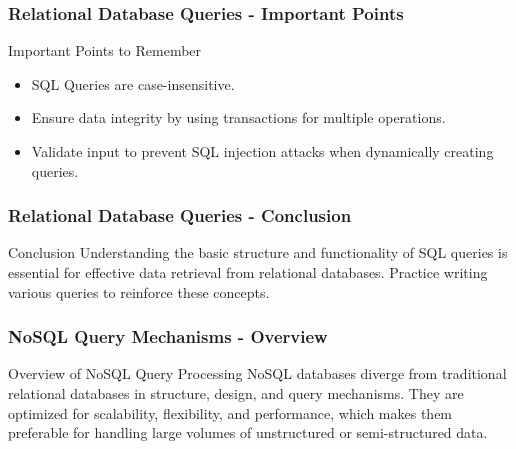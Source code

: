 \documentclass[aspectratio=169]{beamer}
\begin{document}
\begin{frame}[fragile]
    \frametitle{Relational Database Queries - Important Points}
    \begin{block}{Important Points to Remember}
        \begin{itemize}
            \item SQL Queries are case-insensitive.
            \item Ensure data integrity by using transactions for multiple operations.
            \item Validate input to prevent SQL injection attacks when dynamically creating queries.
        \end{itemize}
    \end{block}
\end{frame}

\begin{frame}[fragile]
    \frametitle{Relational Database Queries - Conclusion}
    \begin{block}{Conclusion}
        Understanding the basic structure and functionality of SQL queries is essential for effective data retrieval from relational databases. Practice writing various queries to reinforce these concepts.
    \end{block}
\end{frame}

\begin{frame}[fragile]
    \frametitle{NoSQL Query Mechanisms - Overview}
    \begin{block}{Overview of NoSQL Query Processing}
        NoSQL databases diverge from traditional relational databases in structure, design, and query mechanisms. They are optimized for scalability, flexibility, and performance, which makes them preferable for handling large volumes of unstructured or semi-structured data.
    \end{block}
\end{frame}
\end{document}
